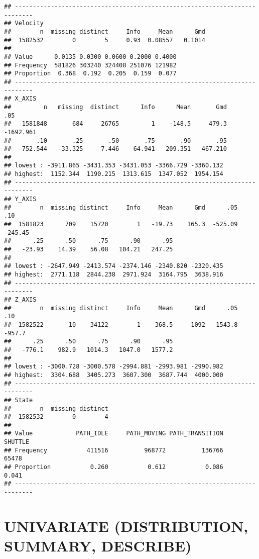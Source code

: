 \documentclass[]{article}
\begin{document}
\begin{verbatim}
## ---------------------------------------------------------------------------
## Velocity 
##        n  missing distinct     Info     Mean      Gmd 
##  1582532        0        5     0.93  0.08557   0.1014 
##                                              
## Value      0.0135 0.0300 0.0600 0.2000 0.4000
## Frequency  581826 303240 324408 251076 121982
## Proportion  0.368  0.192  0.205  0.159  0.077
## ---------------------------------------------------------------------------
## X_AXIS 
##         n   missing  distinct      Info      Mean       Gmd       .05 
##   1581848       684     26765         1    -148.5     479.3 -1692.961 
##       .10       .25       .50       .75       .90       .95 
##  -752.544   -33.325     7.446    64.941   209.351   467.210 
## 
## lowest : -3911.865 -3431.353 -3431.053 -3366.729 -3360.132
## highest:  1152.344  1190.215  1313.615  1347.052  1954.154
## ---------------------------------------------------------------------------
## Y_AXIS 
##        n  missing distinct     Info     Mean      Gmd      .05      .10 
##  1581823      709    15720        1   -19.73    165.3  -525.09  -245.45 
##      .25      .50      .75      .90      .95 
##   -23.93    14.39    56.08   104.21   247.25 
## 
## lowest : -2647.949 -2413.574 -2374.146 -2340.820 -2320.435
## highest:  2771.118  2844.238  2971.924  3164.795  3638.916
## ---------------------------------------------------------------------------
## Z_AXIS 
##        n  missing distinct     Info     Mean      Gmd      .05      .10 
##  1582522       10    34122        1    368.5     1092  -1543.8   -957.7 
##      .25      .50      .75      .90      .95 
##   -776.1    982.9   1014.3   1047.0   1577.2 
## 
## lowest : -3000.728 -3000.578 -2994.881 -2993.981 -2990.982
## highest:  3304.688  3405.273  3607.300  3687.744  4000.000
## ---------------------------------------------------------------------------
## State 
##        n  missing distinct 
##  1582532        0        4 
##                                                                           
## Value            PATH_IDLE     PATH_MOVING PATH_TRANSITION         SHUTTLE
## Frequency           411516          968772          136766           65478
## Proportion           0.260           0.612           0.086           0.041
## ---------------------------------------------------------------------------
\end{verbatim}

\hypertarget{univariate-distribution-summary-describe}{%
\section{UNIVARIATE (DISTRIBUTION, SUMMARY,
DESCRIBE)}\label{univariate-distribution-summary-describe}}
\end{document}

